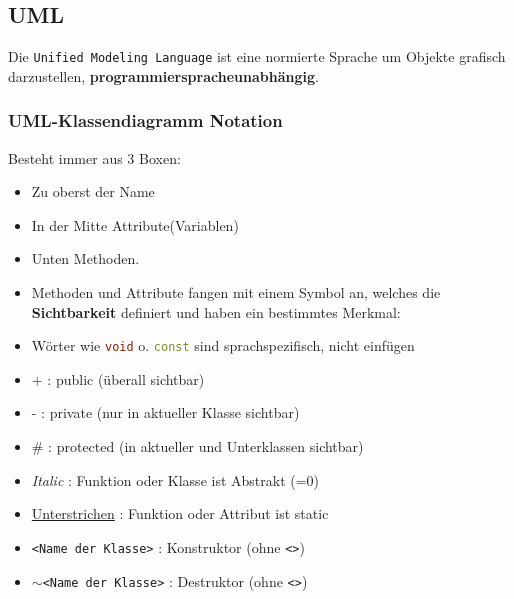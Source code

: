 \subsection{UML}

Die \texttt{Unified Modeling Language} ist eine normierte Sprache um Objekte grafisch 
darzustellen, \textbf{programmierspracheunabhängig}.

\subsubsection{UML-Klassendiagramm Notation}

Besteht immer aus 3 Boxen:\vspace{1em}

\noindent
\begin{minipage}{0.4\columnwidth}
\begin{center}
    
\end{center}
\end{minipage}
\begin{minipage}{0.57\columnwidth}
    \begin{itemize}
        \raggedright
        \item Zu oberst der Name 
        \item In der Mitte Attribute(Variablen)
        \item Unten Methoden.
        \item Methoden und Attribute fangen mit einem Symbol an, welches die \textbf{Sichtbarkeit} 
                definiert und haben ein bestimmtes Merkmal:
        \item Wörter wie \lstinline[language=C++]|void| o. \lstinline[language=C++]|const| sind sprachspezifisch, nicht einfügen
    \end{itemize}
\end{minipage}\vspace{1em}

\begin{itemize}[itemsep=1pt, parsep=0pt]
    \item + : public (überall sichtbar)
    \item - : private (nur in  aktueller Klasse sichtbar)
    \item \# : protected (in aktueller und Unterklassen sichtbar)
    \item \textit{Italic} : Funktion oder Klasse ist Abstrakt (=0)
    \item \underline{Unterstrichen} : Funktion oder Attribut ist static
    \item \verb|<Name der Klasse>| :  Konstruktor (ohne \verb|<>|)
    \item $\sim$\verb|<Name der Klasse>| : Destruktor (ohne \verb|<>|)
\end{itemize}



